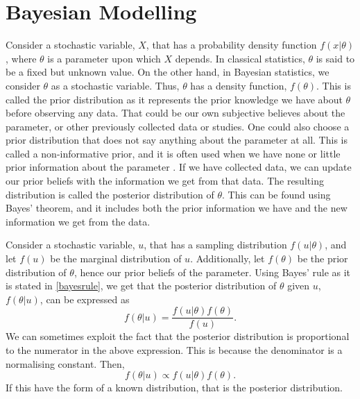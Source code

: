 \section{Bayesian Modelling}
Consider a stochastic variable, $X$, that has a probability density function $f(x|\theta)$, where $\theta$ is a parameter upon which $X$ depends. In classical statistics, $\theta$ is said to be a fixed but unknown value. On the other hand, in Bayesian statistics, we consider $\theta$ as a stochastic variable. Thus, $\theta$ has a density function, $f(\theta)$. This is called the prior distribution as it represents the prior knowledge we have about $\theta$ before observing any data. That could be our own subjective believes about the parameter, or other previously collected data or studies. One could also choose a prior distribution that does not say anything about the parameter at all. This is called a non-informative prior, and it is often used when we have none or little prior information about the parameter \citep{givens2012computational}. 
If we have collected data, we can update our prior beliefs with the information we get from that data. The resulting distribution is called the posterior distribution of $\theta$. This can be found using Bayes' theorem, and it includes both the prior information we have and the new information we get from the data. 

Consider a stochastic variable, $u$, that has a sampling distribution $f(u|\theta)$, and let $f(u)$ be the marginal distribution of $u$. Additionally, let $f(\theta)$ be the prior distribution of $\theta$, hence our prior beliefs of the parameter. Using Bayes' rule as it is stated in \eqref{bayesrule}, we get that the posterior distribution of $\theta$ given $u$, $f(\theta|u)$, can be expressed as \citep{statinf}
\begin{equation*}
    f(\theta|u) = \frac{f(u|\theta)f(\theta)}{f(u)}.
\end{equation*}
We can sometimes exploit the fact that the posterior distribution is proportional to the numerator in the above expression. This is because the denominator is a normalising constant. Then,
\begin{equation}
    \label{posterior_proportional}
    f(\theta|u) \propto f(u|\theta)f(\theta).
\end{equation}
If this have the form of a known distribution, that is the posterior distribution. 

